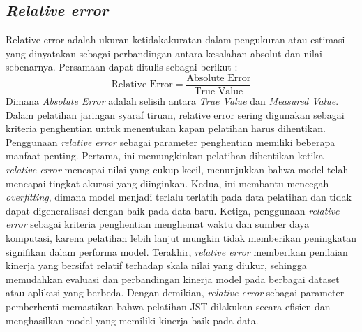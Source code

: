 \subsection{\textit{Relative error}}

Relative error adalah ukuran ketidakakuratan dalam pengukuran atau estimasi yang dinyatakan sebagai perbandingan antara kesalahan absolut dan nilai sebenarnya. Persamaan dapat ditulis sebagai berikut :
\begin{equation}
    \text{Relative Error} = \frac{\text{Absolute Error}}{\text{True Value}}
\end{equation}
Dimana \textit{Absolute Error} adalah selisih antara \textit{True Value} dan \textit{Measured Value}. Dalam pelatihan jaringan syaraf tiruan, relative error sering digunakan sebagai kriteria penghentian untuk menentukan kapan pelatihan harus dihentikan. Penggunaan \textit{relative error} sebagai parameter penghentian memiliki beberapa manfaat penting. Pertama, ini memungkinkan pelatihan dihentikan ketika \textit{relative error} mencapai nilai yang cukup kecil, menunjukkan bahwa model telah mencapai tingkat akurasi yang diinginkan. Kedua, ini membantu mencegah \textit{overfitting}, dimana model menjadi terlalu terlatih pada data pelatihan dan tidak dapat digeneralisasi dengan baik pada data baru. Ketiga, penggunaan \textit{relative error} sebagai kriteria penghentian menghemat waktu dan sumber daya komputasi, karena pelatihan lebih lanjut mungkin tidak memberikan peningkatan signifikan dalam performa model. Terakhir, \textit{relative error} memberikan penilaian kinerja yang bersifat relatif terhadap skala nilai yang diukur, sehingga memudahkan evaluasi dan perbandingan kinerja model pada berbagai dataset atau aplikasi yang berbeda. Dengan demikian, \textit{relative error} sebagai parameter pemberhenti memastikan bahwa pelatihan JST dilakukan secara efisien dan menghasilkan model yang memiliki kinerja baik pada data.